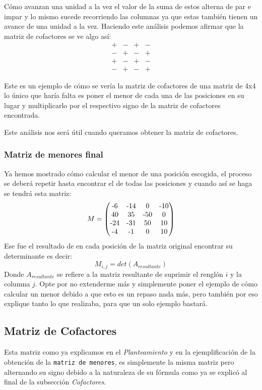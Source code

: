 \documentclass{article}
\begin{document}
Cómo avanzan una unidad a la vez el valor de la suma de estos alterna de par e impar y lo mismo
sucede recorriendo las columnas ya que estas también tienen un avance de una unidad a la vez.
Haciendo este análisis podemos afirmar que la matriz de cofactores se ve algo así:
\begin{equation*}
   \begin{matrix}
       + & - & + & - \\
       - & + & - & + \\
       + & - & + & - \\
       - & + & - & +
   \end{matrix}
\end{equation*}


Este es un ejemplo de cómo se vería la matriz de cofactores de una matriz de 4x4 lo
único que haría falta es poner el menor de cada una de las posiciones en su lugar y
multiplicarlo por el respectivo signo de la matriz de cofactores encontrada.


Este análisis nos será útil cuando queramos obtener la matriz de cofactores.


\subsubsection*{Matriz de menores final}


Ya hemos mostrado cómo calcular el menor de una posición escogida, el proceso se deberá
repetir hasta encontrar el de todas las posiciones y cuando así se haga se tendrá esta
matriz:
\begin{equation*}
   M =
   \begin{pmatrix}
      $-6$ & $-14$ & $0$ & $-10$ \\
      $40$ & $35$ & $-50$ & $0$\\
      $-24$ & $-31$ & $50$ & $10$\\
      $-4$ & $-1$ & $0$ & $10$
   \end{pmatrix}
\end{equation*}
Ese fue el resultado de en cada posición de la matriz original encontrar su determinante
es decir:
$$M_{i,j} = det(A_{resultante})$$
Donde $A_{resultante}$ se refiere a la matriz resultante de suprimir el renglón $i$ y la
columna $j$.
Opte por no extenderme más y simplemente poner el ejemplo de cómo calcular un menor debido
a que esto es un repaso nada más, pero también por eso explique tanto lo que realizaba,
para que un solo ejemplo bastará.


\subsection{Matriz de Cofactores}
Esta matriz como ya explicamos en el \textsl{Planteamiento} y en la ejemplificación de
la obtención de la \texttt{matriz de menores}, es simplemente la misma matriz pero alternando
su signo debido a la naturaleza de su fórmula como ya se explicó al final de la subsección
\emph{Cofactores}.
\end{document}
